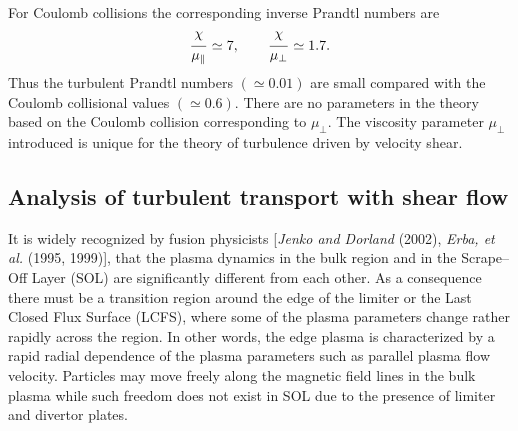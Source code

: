 \documentclass[a4paper,openany,12pt]{book}
\def\chix{\raise.5ex\hbox{$\chi$}}
\begin{document}
{For Coulomb collisions the corresponding inverse Prandtl numbers are
$$\frac{\chix}{\mu_\|}\simeq 7,\qquad \frac{\chix}{\mu_\perp}\simeq 1.7.$$
Thus the turbulent Prandtl numbers $(\simeq 0.01)$ are small compared with the Coulomb collisional values 
$(\simeq 0.6)$. There are no parameters in the theory based on the Coulomb collision corresponding to $\mu_\perp$. The viscosity parameter $\mu_\perp$ introduced is unique for the theory of turbulence driven by velocity shear.

\subsection{Analysis of turbulent transport with shear flow}

It is widely recognized by fusion physicists [\emph{Jenko and Dorland} (2002), \emph{Erba, et al.} (1995, 1999)], that the plasma dynamics in the bulk region and in the Scrape--Off Layer (SOL) are significantly different from each other. As a consequence there must be a transition region around the edge of the limiter or the Last Closed Flux Surface (LCFS), where some of the plasma parameters change rather rapidly across the region. In other words, the edge plasma is characterized by a rapid radial dependence of the plasma parameters such as parallel plasma flow velocity. Particles may move freely along the magnetic field lines in the bulk plasma while such freedom does not exist in SOL due to the presence of limiter and divertor plates.

}
\end{document}
